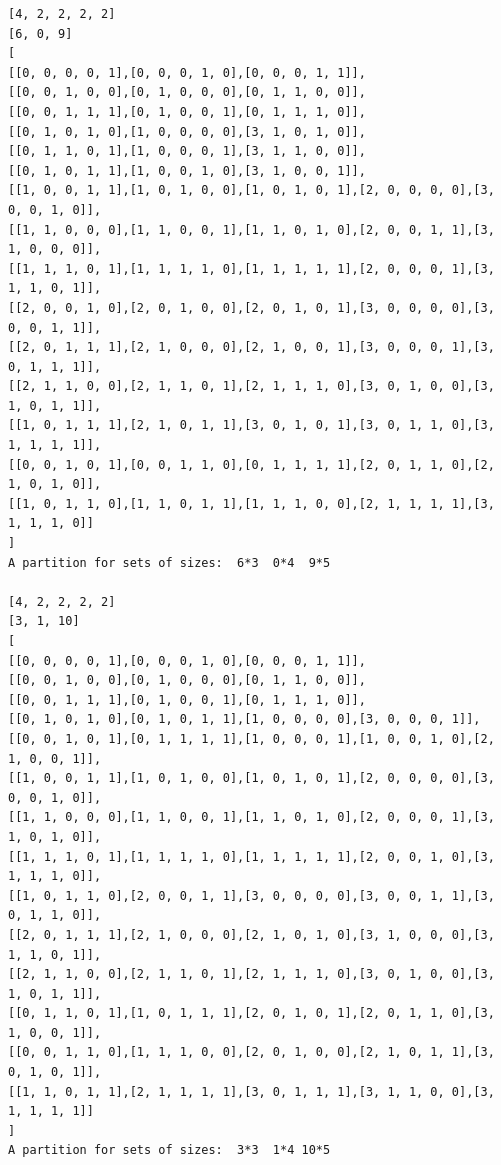 \documentclass[final]{dmtcs-episciences}
\begin{document}
\begin{appendices}
\begin{verbatim}
[4, 2, 2, 2, 2]
[6, 0, 9]
[
[[0, 0, 0, 0, 1],[0, 0, 0, 1, 0],[0, 0, 0, 1, 1]],
[[0, 0, 1, 0, 0],[0, 1, 0, 0, 0],[0, 1, 1, 0, 0]],
[[0, 0, 1, 1, 1],[0, 1, 0, 0, 1],[0, 1, 1, 1, 0]],
[[0, 1, 0, 1, 0],[1, 0, 0, 0, 0],[3, 1, 0, 1, 0]],
[[0, 1, 1, 0, 1],[1, 0, 0, 0, 1],[3, 1, 1, 0, 0]],
[[0, 1, 0, 1, 1],[1, 0, 0, 1, 0],[3, 1, 0, 0, 1]],
[[1, 0, 0, 1, 1],[1, 0, 1, 0, 0],[1, 0, 1, 0, 1],[2, 0, 0, 0, 0],[3, 0, 0, 1, 0]],
[[1, 1, 0, 0, 0],[1, 1, 0, 0, 1],[1, 1, 0, 1, 0],[2, 0, 0, 1, 1],[3, 1, 0, 0, 0]],
[[1, 1, 1, 0, 1],[1, 1, 1, 1, 0],[1, 1, 1, 1, 1],[2, 0, 0, 0, 1],[3, 1, 1, 0, 1]],
[[2, 0, 0, 1, 0],[2, 0, 1, 0, 0],[2, 0, 1, 0, 1],[3, 0, 0, 0, 0],[3, 0, 0, 1, 1]],
[[2, 0, 1, 1, 1],[2, 1, 0, 0, 0],[2, 1, 0, 0, 1],[3, 0, 0, 0, 1],[3, 0, 1, 1, 1]],
[[2, 1, 1, 0, 0],[2, 1, 1, 0, 1],[2, 1, 1, 1, 0],[3, 0, 1, 0, 0],[3, 1, 0, 1, 1]],
[[1, 0, 1, 1, 1],[2, 1, 0, 1, 1],[3, 0, 1, 0, 1],[3, 0, 1, 1, 0],[3, 1, 1, 1, 1]],
[[0, 0, 1, 0, 1],[0, 0, 1, 1, 0],[0, 1, 1, 1, 1],[2, 0, 1, 1, 0],[2, 1, 0, 1, 0]],
[[1, 0, 1, 1, 0],[1, 1, 0, 1, 1],[1, 1, 1, 0, 0],[2, 1, 1, 1, 1],[3, 1, 1, 1, 0]]
]
A partition for sets of sizes:  6*3  0*4  9*5

[4, 2, 2, 2, 2]
[3, 1, 10]
[
[[0, 0, 0, 0, 1],[0, 0, 0, 1, 0],[0, 0, 0, 1, 1]],
[[0, 0, 1, 0, 0],[0, 1, 0, 0, 0],[0, 1, 1, 0, 0]],
[[0, 0, 1, 1, 1],[0, 1, 0, 0, 1],[0, 1, 1, 1, 0]],
[[0, 1, 0, 1, 0],[0, 1, 0, 1, 1],[1, 0, 0, 0, 0],[3, 0, 0, 0, 1]],
[[0, 0, 1, 0, 1],[0, 1, 1, 1, 1],[1, 0, 0, 0, 1],[1, 0, 0, 1, 0],[2, 1, 0, 0, 1]],
[[1, 0, 0, 1, 1],[1, 0, 1, 0, 0],[1, 0, 1, 0, 1],[2, 0, 0, 0, 0],[3, 0, 0, 1, 0]],
[[1, 1, 0, 0, 0],[1, 1, 0, 0, 1],[1, 1, 0, 1, 0],[2, 0, 0, 0, 1],[3, 1, 0, 1, 0]],
[[1, 1, 1, 0, 1],[1, 1, 1, 1, 0],[1, 1, 1, 1, 1],[2, 0, 0, 1, 0],[3, 1, 1, 1, 0]],
[[1, 0, 1, 1, 0],[2, 0, 0, 1, 1],[3, 0, 0, 0, 0],[3, 0, 0, 1, 1],[3, 0, 1, 1, 0]],
[[2, 0, 1, 1, 1],[2, 1, 0, 0, 0],[2, 1, 0, 1, 0],[3, 1, 0, 0, 0],[3, 1, 1, 0, 1]],
[[2, 1, 1, 0, 0],[2, 1, 1, 0, 1],[2, 1, 1, 1, 0],[3, 0, 1, 0, 0],[3, 1, 0, 1, 1]],
[[0, 1, 1, 0, 1],[1, 0, 1, 1, 1],[2, 0, 1, 0, 1],[2, 0, 1, 1, 0],[3, 1, 0, 0, 1]],
[[0, 0, 1, 1, 0],[1, 1, 1, 0, 0],[2, 0, 1, 0, 0],[2, 1, 0, 1, 1],[3, 0, 1, 0, 1]],
[[1, 1, 0, 1, 1],[2, 1, 1, 1, 1],[3, 0, 1, 1, 1],[3, 1, 1, 0, 0],[3, 1, 1, 1, 1]]
]
A partition for sets of sizes:  3*3  1*4 10*5



\end{verbatim}
\end{appendices}
\end{document}
